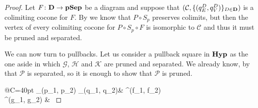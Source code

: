 \documentclass[3p]{elsarticle}
\def\D{\textbf {\textup{D}}}
\newcommand{\catname}[1]{\textbf{\textup{#1}}}
\newcommand{\hyp}{\catname{Hyp}}
\newcommand{\pshyp}{\catname{pSep}}
\theoremstyle{remark}
\theoremstyle{definition}
\begin{document}
\begin{proof}\label{proof:limpsy}
	Let  $F\colon \D \to \pshyp$ be a diagram and suppose that $(\mathcal{C}, \{(q^D_E, q^D_V)\}_{D\in \D})$  is a colimiting cocone for $F$.  By  we know that $P\circ S_p$ preserves colimits, but then the vertex of every colimiting cocone for $P\circ S_p \circ F$ is isomorphic to $\mathcal{C}$ and thus  it must be pruned and separated.
	
	\noindent
	\begin{minipage}[l]{.73\linewidth}\setlength{\parindent}{1.5em}
	We can now turn to pullbacks. Let us consider a pullback square in $\hyp$ as the one aside in which $\mathcal{G}$, $\mathcal{H}$ and $\mathcal{K}$ are pruned and separated. We already know, by  that $\mathcal{P}$ is separated, so it is enough to show that $\mathcal{P}$ is pruned.
	\end{minipage}\hfill \begin{minipage}[r]{.25\linewidth}\vspace{-.4cm}
	\xymatrix@R=15pt@C=40pt{ \ar[r]_{(p_1, p_2)} \ar[d]_{(q_1, q_2)}&  \ar[d]^{(f_1, f_2)} \\  \ar[r]^{(g_1, g_2)} & }
	\end{minipage}
	

\end{proof}
\end{document}
